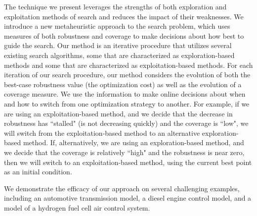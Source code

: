 The technique we present leverages the strengths of both exploration and exploitation methods of search and reduces the impact of their weaknesses.
We introduce a new metaheuristic approach to the search problem, which uses measures of both robustness and coverage to make decisions about how best to guide the search.
Our method is an iterative procedure that utilizes several existing search algorithms, some that are characterized as exploration-based methods and some that are characterized as exploitation-based methods.  
For each iteration of our search procedure, our method considers the evolution of both the best-case robustness value (the optimization cost) as well as the evolution of a coverage measure.
We use the information to make online decisions about when and how to switch from one optimization strategy to another. 
For example, if we are using an exploitation-based method, and we decide that the decrease in robustness has ``stalled" (is not decreasing quickly) and the coverage is ``low", we will switch from the exploitation-based method to an alternative exploration-based method.
If, alternatively, we are using an exploration-based method, and we decide that the coverage is relatively ``high" and the robustness is near zero, then we will switch to an exploitation-based method, using the current best point as an initial condition.
 
We demonstrate the efficacy of our approach on several challenging examples, including an automotive transmission model, a diesel engine control model, and a model of a hydrogen fuel cell air control system.


